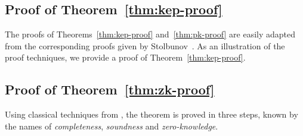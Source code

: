 \documentclass[jmc]{degruyter-journal-a}
\theoremstyle{definition}
\begin{document}
\subsection{Proof of Theorem~\ref{thm:kep-proof}}\label{subsec:zkp-proof}

The proofs of Theorems~\ref{thm:kep-proof} and~\ref{thm:pk-proof} are
easily adapted from the corresponding proofs given by
Stolbunov~\cite{stolbunov-red}. As an illustration of the proof
techniques, we provide a proof of Theorem~\ref{thm:kep-proof}.



\subsection{Proof of Theorem~\ref{thm:zk-proof}}

Using classical techniques from
\cite{goldreich+micali+widgerson91,feige+fiat+shamir88}, the theorem
is proved in three steps, known by the names of \emph{completeness},
\emph{soundness} and \emph{zero-knowledge}.
\end{document}
